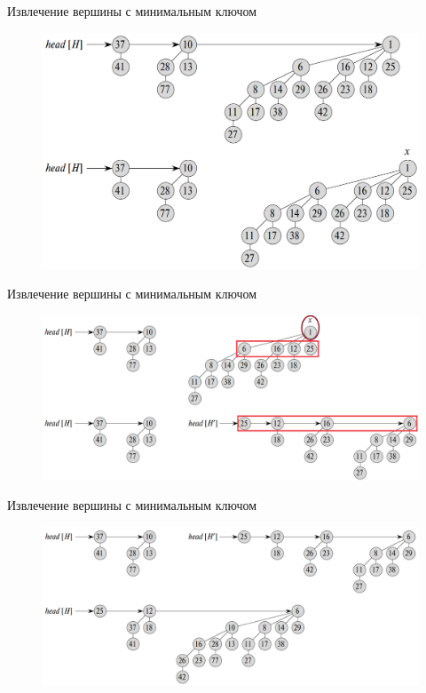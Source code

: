 \begin{frame}{Извлечение вершины с минимальным ключом}
	\begin{figure}
		\includegraphics[width=0.8\linewidth]{images/binom-heap-extract-min0.png}
	\end{figure}
\end{frame}

\begin{frame}{Извлечение вершины с минимальным ключом}
	\begin{figure}
		\includegraphics[width=1\linewidth]{images/binom-heap-extract-min1.png}
	\end{figure}
\end{frame}

\begin{frame}{Извлечение вершины с минимальным ключом}
	\begin{figure}
		\includegraphics[width=1\linewidth]{images/binom-heap-extract-min2.png}
	\end{figure}
\end{frame}


